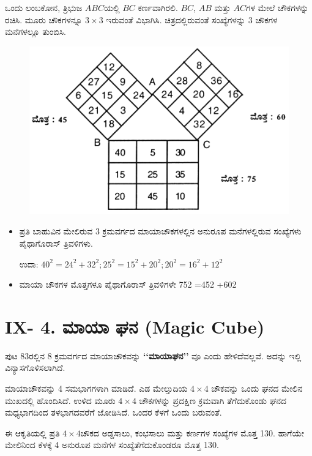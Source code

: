 \medskip
ಒಂದು ಲಂಬಕೋನ, ತ್ರಿಭುಜ $ABC$ಯಲ್ಲಿ $BC$ ಕರ್ಣವಾಗಿರಲಿ. $BC$, $AB$ ಮತ್ತು $AC$ಗಳ ಮೇಲೆ ಚೌಕಗಳನ್ನು ರಚಿಸಿ. ಮೂರು ಚೌಕಗಳನ್ನೂ $3 \times 3$ ಇರುವಂತೆ \break ವಿಭಾಗಿಸಿ. ಚಿತ್ರದಲ್ಲಿರುವಂತೆ ಸಂಖ್ಯೆಗಳನ್ನು 3 ಚೌಕಗಳ ಮನೆಗಳಲ್ಲೂ ತುಂಬಿಸಿ.
\begin{figure}[H]
\includegraphics[scale=1.2]{src/figures/chap8/fig8-10.jpg}
\end{figure}
\begin{itemize}
	\item ಪ್ರತಿ ಬಾಹುವಿನ ಮೇಲಿರುವ 3 ಕ್ರಮವರ್ಗದ ಮಾಯಾಚೌಕಗಳಲ್ಲಿನ ಅನುರೂಪ ಮನೆಗಳಲ್ಲಿರುವ ಸಂಖ್ಯೆಗಳು ಪೈಥಾಗೊರಾಸ್ ತ್ರಿವಳಿಗಳು.

	ಉದಾ: $40^2 = 24^2 +32^2 ; 25^2 =15^2 +20^2 ; 20^2 =16^2+12^2$\smallskip
	\item ಮಾಯಾ ಚೌಕಗಳ ಮೊತ್ತಗಳೂ ಪೈಥಾಗೊರಾಸ್ ತ್ರಿವಳಿಗಳೇ 752 =452 +602
\end{itemize}
\eject

\section*{IX- 4. ಮಾಯಾ ಘನ (Magic Cube)}

ಪುಟ 83ರಲ್ಲಿನ 8 ಕ್ರಮವರ್ಗದ ಮಾಯಾಚೌಕವನ್ನು \textbf{‘‘ಮಾಯಾಘನ’’} ವೂ ಎಂದು ಹೇಳಿದೆವಲ್ಲವೆ. ಅದನ್ನು ಇಲ್ಲಿ ವಿನ್ಯಾಸಗೊಳಿಸಲಾಗಿದೆ.

ಮಾಯಾಚೌಕವನ್ನು 4 ಸಮಭಾಗಗಳಾಗಿ ಮಾಡಿದೆ. ಎಡ ಮೇಲ್ತುದಿಯ $4 \times 4$ ಚೌಕ\-ವನ್ನು ಒಂದು ಘನದ ಮೇಲಿನ ಮುಖದಲ್ಲಿ ಹೊಂದಿಸಿದೆ. ಉಳಿದ ಮೂರು $4 \times 4$ ಚೌಕ\-ಗಳನ್ನು ಪ್ರದಕ್ಷಿಣ ಕ್ರಮವಾಗಿ ತೆಗೆದುಕೊಂಡು ಘನದ ಮಧ್ಯಭಾಗದಿಂದ ತಳಭಾಗದವರೆಗೆ ಜೋಡಿಸಿದೆ. ಒಂದರ ಕೆಳಗೆ ಒಂದು ಬರುವಂತೆ.

ಈ ಆಕೃತಿಯಲ್ಲಿ ಪ್ರತಿ $4 \times 4$ಚೌಕದ ಅಡ್ಡಸಾಲು, ಕಂಭಸಾಲು ಮತ್ತು ಕರ್ಣಗಳ ಸಂಖ್ಯೆ\-ಗಳ ಮೊತ್ತ 130. ಹಾಗೆಯೇ ಮೇಲಿನಿಂದ ಕೆಳಕ್ಕೆ 4 ಅನುರೂಪ ಮನೆಗಳ ಸಂಖ್ಯೆತೆಗೆದು\-ಕೊಂಡರೂ ಮೊತ್ತ 130.

